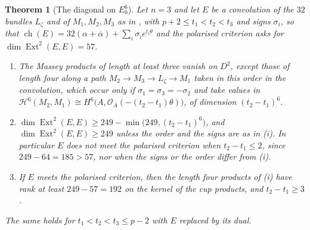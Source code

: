 \documentclass[11pt,reqno]{amsart}
\theoremstyle{plain}
\newtheorem{theorem}{Theorem}[section]
\theoremstyle{definition}
\theoremstyle{remark}
\newcommand{\cO}{\mathcal{O}}
\newcommand{\cH}{\mathcal{H}}
\DeclareMathOperator{\ch}{ch}
\DeclareMathOperator{\Ext}{Ext}
\newcommand{\bbar}[1]{\overline{#1}}
\begin{document}
\begin{theorem}[The diagonal on $E_{0}^{6}$]\label{thm:esixdiagonal}
Let $n=3$ and let $E$ be a convolution of the $32$ bundles $L_{\zeta}$ and
of $M_{1},M_{2},M_{3}$ as in , with
$p+2\le t_{1}<t_{2}<t_{3}$ and signs $\sigma_{i}$, so that
$\ch(E)=32(\alpha+\bbar\alpha)+\sum_{i}\sigma_{i}e^{t_{i}\theta}$ and the
polarised criterion asks for $\dim\Ext^{2}(E,E)=57$.
\begin{enumerate}[label=\textup{(\roman*)},leftmargin=2.6em,itemsep=2pt]
\item The Massey products of length at least three vanish on $D^{2}$, except
  those of length four along a path
  $M_{2}\to M_{3}\to L_{\zeta}\to M_{1}$ taken in this order in the
  convolution, which occur only if $\sigma_{1}=\sigma_{3}=-\sigma_{2}$ and
  take values in
  $\cH^{6}(M_{2},M_{1})\cong H^{6}\bigl(A,\cO_{A}(-(t_{2}-t_{1})\theta)\bigr)$,
  of dimension $(t_{2}-t_{1})^{6}$.
\item $\dim\Ext^{2}(E,E)\ge249-\min\bigl(249,(t_{2}-t_{1})^{6}\bigr)$, and
  $\dim\Ext^{2}(E,E)\ge249$ unless the order and the signs are as in (i).
  In particular $E$ does not meet the polarised criterion when
  $t_{2}-t_{1}\le2$, since $249-64=185>57$, nor when the signs or the order
  differ from (i).
\item If $E$ meets the polarised criterion, then the length four products
  of (i) have rank at least $249-57=192$ on the kernel of the cup products,
  and $t_{2}-t_{1}\ge3$.
\end{enumerate}
The same holds for $t_{1}<t_{2}<t_{3}\le p-2$ with $E$ replaced by its dual.
\end{theorem}
\end{document}
